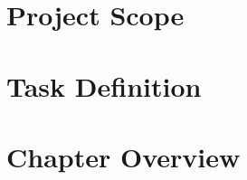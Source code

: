 \section{Project Scope}
	
	\label{sec:1-scope}
	
\section{Task Definition}
	
	\label{sec:1-task}
	
\section{Chapter Overview}
	
	\label{sec:1-chapters}